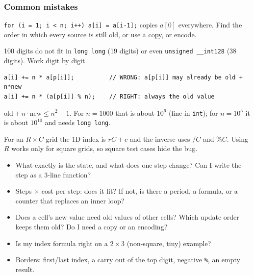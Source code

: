 \subsubsection*{Common mistakes}

\begin{warningbox}
\texttt{for (i = 1; i < n; i++) a[i] = a[i-1];} copies $a[0]$ everywhere. Find the order in which every source is still old, or use a copy, or encode.
\end{warningbox}

\begin{warningbox}
100 digits do not fit in \texttt{long long} (19 digits) or even \texttt{unsigned \_\_int128} (38 digits). Work digit by digit.
\end{warningbox}

\begin{warningbox}
\begin{lstlisting}[style=snippet]
a[i] += n * a[p[i]];          // WRONG: a[p[i]] may already be old + n*new
a[i] += n * (a[p[i]] % n);    // RIGHT: always the old value
\end{lstlisting}
\end{warningbox}

\begin{warningbox}
$\text{old} + n\cdot\text{new} \le n^2 - 1$. For $n = 1000$ that is about $10^6$ (fine in \texttt{int}); for $n = 10^5$ it is about $10^{10}$ and needs \texttt{long long}.
\end{warningbox}

\begin{warningbox}
For an $R \times C$ grid the 1D index is $rC + c$ and the inverse uses $/C$ and $\%C$. Using $R$ works only for square grids, so square test cases hide the bug.
\end{warningbox}

\begin{checklistbox}
\begin{itemize}[leftmargin=*]
    \item[$\square$] What exactly is the state, and what does one step change? Can I write the step as a 3-line function?
    \item[$\square$] Steps $\times$ cost per step: does it fit? If not, is there a period, a formula, or a counter that replaces an inner loop?
    \item[$\square$] Does a cell's new value need old values of other cells? Which update order keeps them old? Do I need a copy or an encoding?
    \item[$\square$] Is my index formula right on a $2 \times 3$ (non-square, tiny) example?
    \item[$\square$] Borders: first/last index, a carry out of the top digit, negative \texttt{\%}, an empty result.
\end{itemize}
\end{checklistbox}

